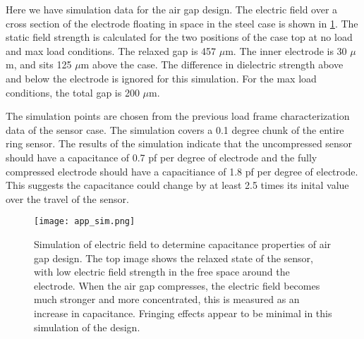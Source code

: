 \label{app:sim}

Here we have simulation data for the air gap design.
The electric field over a cross section of the electrode floating in space in the steel case
is shown in \ref{fig:app_sim}. The static field strength is calculated for the 
two positions of the case top at no load and max load conditions. 
The relaxed gap is 457 $\mu$m. 
The inner electrode is 30 $\mu$m, and sits 125 $\mu$m above the case.
The difference in dielectric strength above and below the
electrode is ignored for this simulation. 
For the max load conditions, the total gap is 200 $\mu$m.

The simulation points are chosen from the previous load frame characterization data of the sensor case.
The simulation covers a 0.1 degree chunk of the entire ring sensor.
The results of the simulation indicate that the uncompressed sensor should have a capacitance of 0.7 pf per degree of electrode
and the fully compressed electrode should have a capacitiance of 1.8 pf per degree of electrode.
This suggests the capacitance could change by at least 2.5 times its inital value over the travel of the sensor.

\begin{figure}[ht]
\centering
\texttt{[image: app\_sim.png]}
\caption{
Simulation of electric field to determine capacitance properties of air gap design.
The top image shows the relaxed state of the sensor, with low electric field strength 
in the free space around the electrode.
When the air gap compresses, the electric field becomes much stronger and more concentrated,
this is measured as an increase in capacitance. Fringing effects appear to be minimal in this
simulation of the design.
}
\label{fig:app_sim}
\end{figure}
